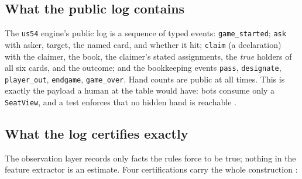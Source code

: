 \documentclass[11pt]{article}
\newcommand{\code}[1]{\texttt{#1}}
\newcommand{\usff}{\code{us54}}
\begin{document}
\subsection{What the public log contains}

The \usff{} engine's public log \cite{rules,repo} is a sequence of typed events:
\code{game\_started}; \code{ask} with asker, target, the named card, and whether it hit;
\code{claim} (a declaration) with the claimer, the book, the claimer's stated assignments,
the \emph{true} holders of all six cards, and the outcome; and the bookkeeping events
\code{pass}, \code{designate}, \code{player\_out}, \code{endgame}, \code{game\_over}. Hand
counts are public at all times. This is exactly the payload a human at the table would have:
bots consume only a \code{SeatView}, and a test enforces that no hidden hand is reachable
\cite{v05,repo}.

\subsection{What the log certifies exactly}
\label{sec:exact}

The observation layer records only facts the rules force to be true; nothing in the feature
extractor is an estimate. Four certifications carry the whole construction \cite{rules}:
\end{document}
